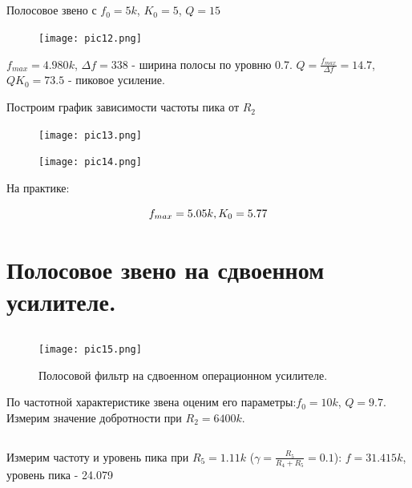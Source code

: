 \documentclass[15pt,a5paper,reqno]{article}
\begin{document}
\subsection{}

Полосовое звено с $f_0 = 5k$, $K_0 = 5$, $Q = 15$

\begin{figure}[h!]
    \centering
    \texttt{[image: pic12.png]}
\end{figure}

$f_{max} = 4.980k$, $\Delta f = 338$ - ширина полосы по уровню 0.7.
$Q=\frac{f_{max}}{\Delta f} = 14.7$, $QK_0 = 73.5$ - пиковое усиление.

Построим график зависимости частоты пика от $R_2$


\begin{figure}[h!]
    \centering
    \texttt{[image: pic13.png]}
\end{figure}


\begin{figure}[h!]
    \centering
    \texttt{[image: pic14.png]}
\end{figure}


На практике:


\begin{equation*}
	f_{max} = 5.05k, \hfill K_0 = 5.77
\end{equation*}


\section{Полосовое звено на сдвоенном усилителе.}

\subsection{}
\begin{figure}[h!]
    \centering
    \texttt{[image: pic15.png]}
    \caption*{Полосовой фильтр на сдвоенном операционном усилителе.}
\end{figure}


По частотной характеристике звена оценим его параметры:$f_0 =
10k$, $Q = 9.7$. Измерим значение добротности при $R_2 = 6400k$.

\subsection{}

Измерим частоту и уровень пика при $R_5 = 1.11k$ ($\gamma = \frac{R_5}{R_4 + R_5} = 0.1$): $f = 31.415k$, уровень пика - 24.079
\end{document}
